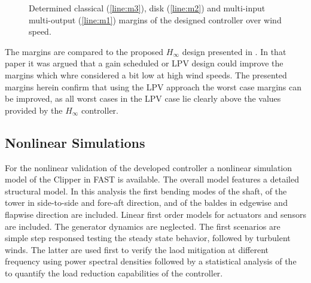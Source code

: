 \documentclass[times]{weauth}
\begin{document}
\begin{figure}[hbt]
	\centering
	
	\caption{Determined classical (\ref{line:m3}), disk (\ref{line:m2}) and multi-input multi-output  (\ref{line:m1}) margins of the designed controller over wind speed.}
	\label{fig:margins}	
\end{figure}

The margins are compared to the proposed $H_\infty$ design presented in \cite{}. In that paper it was argued that a 
gain scheduled or LPV design could improve the margins which whre considered a bit low at high wind speeds.
The presented margins herein confirm that using the LPV approach the worst case margins can be improved, as all worst cases
in the LPV case lie clearly above the values provided by the $H_\infty$ controller.




\subsection{Nonlinear Simulations}
For the nonlinear validation of the developed controller a nonlinear simulation model of the Clipper in FAST \cite{Fastv7_05} is available. The overall model features a detailed structural model. In this analysis the first bending modes of the shaft, of the tower in side-to-side and fore-aft direction, and of the baldes in edgewise and flapwise direction are included.
Linear first order models for actuators and sensors are included. The generator dynamics are neglected. The first scenarios
are simple step responsed testing the steady state behavior, followed by turbulent winds. The latter are used first to
verify the laod mitigation at different frequency using power spectral densities followed by a statistical analysis
of the to quantify the load reduction capabilities of the controller.
\end{document}
